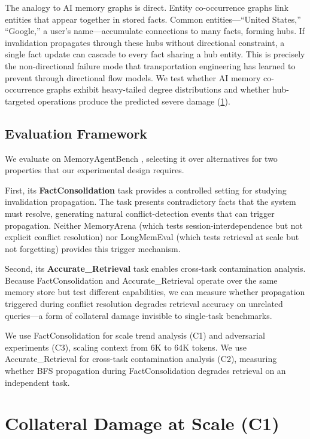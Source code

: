 \documentclass[11pt]{article}
\begin{document}
The analogy to AI memory graphs is direct.
Entity co-occurrence graphs link entities that appear together in stored facts.
Common entities---``United States,'' ``Google,'' a user's name---accumulate connections to many facts, forming hubs.
If invalidation propagates through these hubs without directional constraint, a single fact update can cascade to every fact sharing a hub entity.
This is precisely the non-directional failure mode that transportation engineering has learned to prevent through directional flow models.
We test whether AI memory co-occurrence graphs exhibit heavy-tailed degree distributions and whether hub-targeted operations produce the predicted severe damage (\cref{sec:c1}).

\subsection{Evaluation Framework}
\label{sec:bg_eval}

We evaluate on MemoryAgentBench \citep{memoryagentbench_2026}, selecting it over alternatives for two properties that our experimental design requires.

First, its \textbf{FactConsolidation} task provides a controlled setting for studying invalidation propagation.
The task presents contradictory facts that the system must resolve, generating natural conflict-detection events that can trigger propagation.
Neither MemoryArena \citep{memoryarena_2026} (which tests session-interdependence but not explicit conflict resolution) nor LongMemEval \citep{longmemeval_2024} (which tests retrieval at scale but not forgetting) provides this trigger mechanism.

Second, its \textbf{Accurate\_Retrieval} task enables cross-task contamination analysis.
Because FactConsolidation and Accurate\_Retrieval operate over the same memory store but test different capabilities, we can measure whether propagation triggered during conflict resolution degrades retrieval accuracy on unrelated queries---a form of collateral damage invisible to single-task benchmarks.

We use FactConsolidation for scale trend analysis (C1) and adversarial experiments (C3), scaling context from 6K to 64K tokens.
We use Accurate\_Retrieval for cross-task contamination analysis (C2), measuring whether BFS propagation during FactConsolidation degrades retrieval on an independent task.


\section{Collateral Damage at Scale (C1)}
\label{sec:c1}
\end{document}
